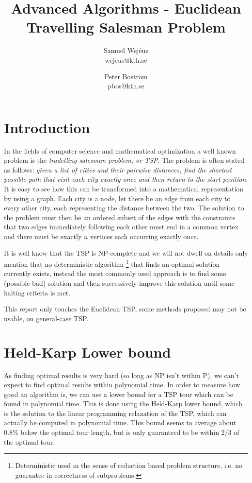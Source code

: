 \documentclass[a4paper,12pt,oneside]{article}
\title{Advanced Algorithms - Euclidean Travelling Salesman Problem}
\author{Samuel Wej\'eus \\ \lowercase{wejeus@kth.se} \and Peter Boström \\ \lowercase{pbos@kth.se} }
\begin{document}
\maketitle

\section{Introduction}
In the fields of computer science and mathematical optimization a well known problem is the \textit{tradelling salesman problem, or TSP}. The problem is often stated as follows: \textit{given a list of cities and their pairwise distances, find the shortest possible path that visit each city exactly once and then return to the start position}. It is easy to see how this can be transformed into a mathematical representation by using a graph. Each city is a node, let there be an edge from each city to every other city, each representing the distance between the two. The solution to the problem must then be an ordered subset of the edges with the constraints that two edges immediately following each other must end in a common vertex and there must be exactly $n$ vertices each occurring exactly once.

It is well know that the TSP is NP-complete and we will not dwell on details only mention that no deterministic algorithm \footnote{Deterministic used in the sense of reduction based problem structure, i.e. no guarantee in correctness of subproblems.} that finds an optimal solution currently exists, instead the most commonly used approach is to find some (possible bad) solution and then successively improve this solution until some halting criteria is met.

This report only touches the Euclidean TSP, some methods proposed may not be usable, on general-case TSP.

\section{Held-Karp Lower bound}

As finding optimal results is very hard (so long as NP isn't within P), we can't expect to find optimal results within polynomial time. In order to measure how good an algorithm is, we can use a lower bound for a TSP tour which can be found in polynomial time. This is done using the Held-Karp lower bound, which is the solution to the linear programming relaxation of the TSP, which can actually be computed in polynomial time\cite{bound}. This bound seems to average about 0.8\% below the optimal tour length, but is only guaranteed to be within 2/3 of the optimal tour. 
\end{document}
